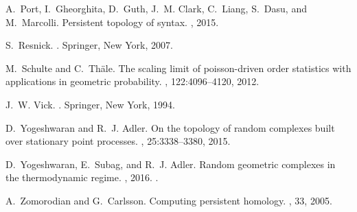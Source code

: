\documentclass[11pt]{amsart}
\numberwithin{equation}{section}
\theoremstyle{plain}
\theoremstyle{definition}
\begin{document}
\begin{thebibliography}{10}
A.~Port, I.~Gheorghita, D.~Guth, J.~M. Clark, C.~Liang, S.~Dasu, and
  M.~Marcolli.
\newblock Persistent topology of syntax.
, 2015.

S.~Resnick.
.
\newblock Springer, New York, 2007.

M.~Schulte and C.~Th\"{a}le.
\newblock The scaling limit of poisson-driven order statistics with
  applications in geometric probability.
, 122:4096--4120,
  2012.

J.~W. Vick.
.
\newblock Springer, New York, 1994.

D.~Yogeshwaran and R.~J. Adler.
\newblock On the topology of random complexes built over stationary point
  processes.
, 25:3338--3380, 2015.

D.~Yogeshwaran, E.~Subag, and R.~J. Adler.
\newblock Random geometric complexes in the thermodynamic regime.
, 2016.
.

A.~Zomorodian and G.~Carlsson.
\newblock Computing persistent homology.
, 33, 2005.

\end{thebibliography}
\end{document}
